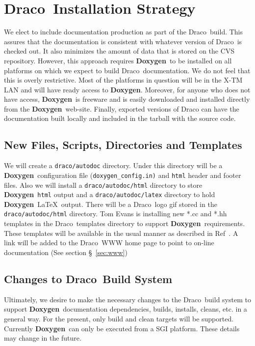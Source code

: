 \documentclass[11pt]{ResearchNote}
\newcommand{\draco}{{\normalfont\sffamily Draco}}
\newcommand{\doxy}{{\normalfont\bfseries Doxygen}}
\begin{document}

\section{\draco\ Installation Strategy}
\label{sec:draco}

We elect to include documentation
production as part of the \draco\ build. This assures that the
documentation is consistent with whatever version of \draco\ is
checked out. It also minimizes the amount of data that is stored on
the CVS repository. However, this approach requires
\doxy\ to be installed on all platforms on which we expect to build
\draco\ documentation.  We do not feel that this is overly restrictive.
Most of the platforms in question will be in the X-TM LAN and will have ready 
access to \doxy. Moreover, for anyone who does not
have access, \doxy\ is freeware and is easily downloaded and
installed directly from the \doxy\ web-site.
Finally, exported versions of Draco can have the documentation
built locally and included in the tarball with the source code. 

\subsection{New Files, Scripts, Directories and Templates}
We will create a \texttt{draco/autodoc} directory. Under this directory
will be a \doxy\ configuration file (\texttt{doxygen\_config.in)} and
 \texttt{html} header and footer files. Also we will install 
a \texttt{draco/autodoc/html} directory to store \doxy\ \texttt{html}
output and a \texttt{draco/autodoc/latex}
directory to hold \doxy\ \LaTeX\ output. There will be a \draco\ logo gif
stored in the \texttt{draco/autodoc/html} directory. 
Tom Evans is installing new *.cc and *.hh templates in the \draco\ 
templates directory to support \doxy\ requirements. These templates
will be available in the usual manner as described in Ref~\cite{xtm:9909}.
A link will be added to the \draco\ WWW home page to point to on-line
documentation (See section \S~\ref{sec:www})

\subsection{Changes to \draco\ Build System}

Ultimately, we desire to make the necessary changes to the \draco\
build system to support \doxy\ documentation dependencies,
builds, installs, cleans,
etc. in a general way. For the present, 
only build and clean targets will be supported.
Currently \doxy\
can only be executed from a SGI platform. These details may
change in the future. 
\end{document}

